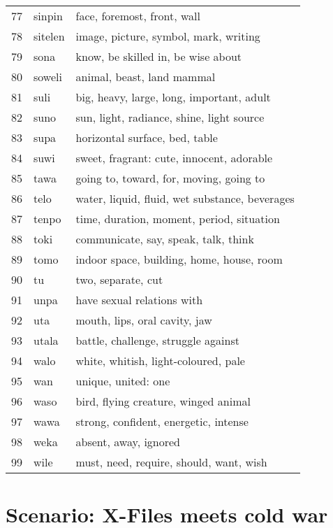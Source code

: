 \documentclass[11pt]{article}
\begin{document}
{\begin{multicols}{2}[]
\begin{center}
\begin{tabularx}{\linewidth}{rlX}
77 & sinpin & face, foremost, front, wall\\[0pt]
78 & sitelen & image, picture, symbol, mark, writing\\[0pt]
79 & sona & know, be skilled in, be wise about\\[0pt]
80 & soweli & animal, beast, land mammal\\[0pt]
81 & suli & big, heavy, large, long, important, adult\\[0pt]
82 & suno & sun, light, radiance, shine, light source\\[0pt]
83 & supa & horizontal surface, bed, table\\[0pt]
84 & suwi & sweet, fragrant: cute, innocent, adorable\\[0pt]
85 & tawa & going to, toward, for, moving, going to\\[0pt]
86 & telo & water, liquid, fluid, wet substance, beverages\\[0pt]
87 & tenpo & time, duration, moment, period, situation\\[0pt]
88 & toki & communicate, say, speak, talk, think\\[0pt]
89 & tomo & indoor space, building, home, house, room\\[0pt]
90 & tu & two, separate, cut\\[0pt]
91 & unpa & have sexual relations with\\[0pt]
92 & uta & mouth, lips, oral cavity, jaw\\[0pt]
93 & utala & battle, challenge, struggle against\\[0pt]
94 & walo & white, whitish, light-coloured, pale\\[0pt]
95 & wan & unique, united: one\\[0pt]
96 & waso & bird, flying creature, winged animal\\[0pt]
97 & wawa & strong, confident, energetic, intense\\[0pt]
98 & weka & absent, away, ignored\\[0pt]
99 & wile & must, need, require, should, want, wish\\[0pt]
\end{tabularx}
\end{center}
\end{multicols}
\normalsize



\section{Scenario: X-Files meets cold war}
\label{sec:org4f7bc71}

}
\end{document}
